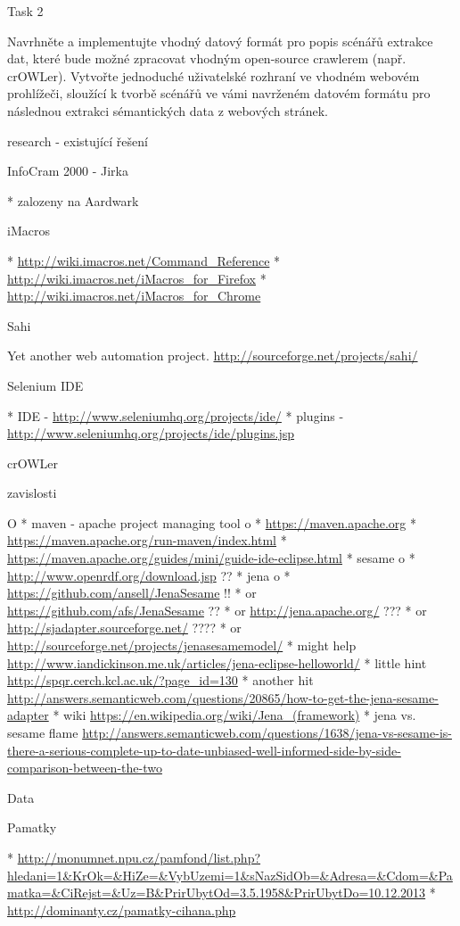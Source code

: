 \chap Task 2

Navrhněte a implementujte vhodný datový formát pro popis scénářů extrakce dat,
které bude možné zpracovat vhodným open-source crawlerem (např.
crOWLer).  Vytvořte jednoduché
uživatelské rozhraní ve vhodném webovém prohlížeči, sloužící k tvorbě scénářů
ve vámi navrženém datovém formátu pro následnou extrakci sémantických data z
webových stránek. 


\sec research - existující řešení


\secc InfoCram 2000 - Jirka

\begitems
  * zalozeny na Aardwark 
\enditems


\secc iMacros

\begitems
  * \url{http://wiki.imacros.net/Command_Reference}
  * \url{http://wiki.imacros.net/iMacros_for_Firefox}
  * \url{http://wiki.imacros.net/iMacros_for_Chrome}
\enditems


\secc Sahi

Yet another web automation project. \url{http://sourceforge.net/projects/sahi/}


\secc Selenium IDE

\begitems
  * IDE - \url{http://www.seleniumhq.org/projects/ide/}
  * plugins - \url{http://www.seleniumhq.org/projects/ide/plugins.jsp}
\enditems






\sec crOWLer

\secc zavislosti

\begitems \style O
  * maven - apache project managing tool
  \begitems \style o
    * \url{https://maven.apache.org}
    * \url{https://maven.apache.org/run-maven/index.html}
    * \url{https://maven.apache.org/guides/mini/guide-ide-eclipse.html}
  \enditems
  * sesame
  \begitems \style o
    * \url{http://www.openrdf.org/download.jsp} ??
  \enditems
  * jena
  \begitems \style o
    * \url{https://github.com/ansell/JenaSesame} !!
    * or \url{https://github.com/afs/JenaSesame} ??
    * or \url{http://jena.apache.org/} ???
    * or \url{http://sjadapter.sourceforge.net/} ????
    * or \url{http://sourceforge.net/projects/jenasesamemodel/}
    * might help \url{http://www.iandickinson.me.uk/articles/jena-eclipse-helloworld/}
    * little hint \url{http://spqr.cerch.kcl.ac.uk/?page_id=130}
    * another hit \url{http://answers.semanticweb.com/questions/20865/how-to-get-the-jena-sesame-adapter}
    * wiki \url{https://en.wikipedia.org/wiki/Jena_(framework)}
    * jena vs. sesame flame \url{http://answers.semanticweb.com/questions/1638/jena-vs-sesame-is-there-a-serious-complete-up-to-date-unbiased-well-informed-side-by-side-comparison-between-the-two}
  \enditems
\enditems



\chap Data

\sec Pamatky

\begitems
  * \url{http://monumnet.npu.cz/pamfond/list.php?hledani=1&KrOk=&HiZe=&VybUzemi=1&sNazSidOb=&Adresa=&Cdom=&Pamatka=&CiRejst=&Uz=B&PrirUbytOd=3.5.1958&PrirUbytDo=10.12.2013}
  * \url{http://dominanty.cz/pamatky-cihana.php}
\enditems


\bye
